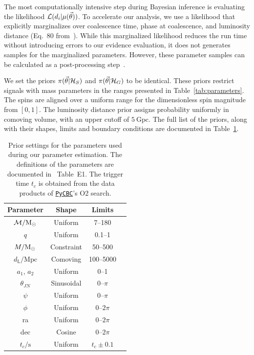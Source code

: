 \documentclass[%
 nofootinbib,
 amsmath,amssymb,
 aps,
 twocolumn,
 superscriptaddress
]{revtex4-2}
\newcommand{\pycbc}{{\sc \href{https://pycbc.org/}{\texttt{PyCBC}}}\xspace}
\newcommand{\mathcmd}[1]{{\sc \relax\ifmmode#1\else $#1$\fi}\xspace}
\newcommand{\msun}{\mathcmd{\text{M}_\odot}}
\newcommand{\parameters}{\mathcmd{\vec{\theta}}}
\newcommand{\template}{\mathcmd{\mu(\parameters)}}
\begin{document}
The most computationally intensive step during Bayesian inference is evaluating the likelihood $\mathcal{L}(d_i|\template)$. To accelerate our analysis, we use a likelihood that explicitly marginalizes over coalescence time, phase at coalescence, and luminosity distance (Eq.~80 from~\citet{intro_to_gw_bayes}). While this marginalized likelihood reduces the run time without introducing errors to our evidence evaluation, it does not generates samples for the marginalized parameters. However, these parameter samples can be calculated as a post-processing step~\cite{intro_to_gw_bayes}.

We set the priors $\pi(\parameters|\mathcal{H}_S)$ and $\pi(\parameters|\mathcal{H}_G)$ to be identical. These priors restrict signals with mass parameters in the ranges presented in Table~\ref{tab:parameters}. The spins are aligned over a uniform range for the dimensionless spin magnitude from $\left[0,1\right]$. The luminosity distance prior assigns probability uniformly in comoving volume, with an upper cutoff of $5\ \text{Gpc}$. The full list of the priors, along with their shapes, limits and boundary conditions are documented in Table~\ref{tab:priors}. 

\begin{table}
    \centering
    \caption{
    Prior settings for the parameters used during our parameter estimation. The definitions of the parameters are documented in \citet{bilby_gwtc}~Table~E1. The trigger time $t_c$ is obtained from the data products of \pycbc's O2 search. \label{tab:priors}} 
    \begin{tabular}{c c c c}
    \hline
    Parameter & Shape & Limits \\
    \hline
          $\mathcal{M}/\msun$           & Uniform & 7--180  \\
          $q$                           & Uniform & 0.1--1  \\
          $M/\msun$                     & Constraint & 50--500  \\
          $d_\mathrm{L}/\mathrm{Mpc}$   & Comoving & 100--5000  \\
          $a_1$, $a_2$                  & Uniform & 0--1  \\
          $\theta_{JN}$                 & Sinusoidal & 0--$\pi$  \\
          $\psi$                        & Uniform & 0--$\pi$  \\
          $\phi$                        & Uniform & 0--$2\pi$  \\
          ra                            & Uniform & 0--$2\pi$  \\
          dec                           & Cosine & 0--$2\pi$  \\
          $t_c/\mathrm{s}$              & Uniform & $t_c\pm0.1$  \\
    \hline
    \end{tabular}
\end{table}
\end{document}
